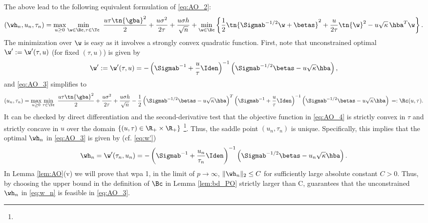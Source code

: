 The above lead to the following equivalent formulation of \eqref{eq:AO_2}:
\begin{align}
\left(\wh_n,u_n,\tau_n\right) = \max_{u\geq 0}\min_{\w\in\Bc,\tau\in\Tc} ~ \frac{u\tau\tn{\gba}^2}{2} + \frac{u\sigma^2}{2\tau} + \frac{u\sigma h}{\sqrt{n}} + \min_{\w\in\Bc} \left\{ \frac{1}{2}\tn{\Sigmab^{-1/2}\w+\betas}^2 + \frac{u}{2\tau}\tn{\w}^2 - u \sqrt{\kappa}\,{\hba}^T\w \right\} .\label{eq:AO_3}
\end{align}
The minimization over $\w$ is easy as it involves a strongly convex quadratic function. First, note that unconstrained optimal $\w':=\w'(\tau,u)$ (for fixed $(\tau,u)$) is given by
\begin{align}\label{eq:w'}
\w':=\w'(\tau,u) = -\left(\Sigmab^{-1}+\frac{u}{\tau}\Iden\right)^{-1}\left(\Sigmab^{-1/2}\betas-u\sqrt{\kappa}\hba\right), 
\end{align}
and \eqref{eq:AO_3} simplifies to
\begin{align}
\left(u_n,\tau_n\right)=\max_{u\geq 0}\min_{\tau\in\Tc} ~ \frac{u\tau\tn{\gba}^2}{2} + \frac{u\sigma^2}{2\tau} + \frac{u\sigma h}{\sqrt{n}} - \frac{1}{2} \left(\Sigmab^{-1/2}\betas-u\sqrt{\kappa}\hba\right)^T\left(\Sigmab^{-1}+\frac{u}{\tau}\Iden\right)^{-1} \left(\Sigmab^{-1/2}\betas-u\sqrt{\kappa}\hba\right)\,=:\Rc(u,\tau) .\label{eq:AO_4}
\end{align}
It can be checked by direct differentiation and the second-derivative test that the objective function in \eqref{eq:AO_4} is strictly convex in $\tau$ and strictly concave in $u$ over the domain $\{(u,\tau)\in\R_+\times\R_+\}$ \footnote{}. Thus, the saddle point $(u_n,\tau_n)$ is unique. Specifically, this implies that the optimal $\wh_n$ in \eqref{eq:AO_3} is given by (cf. \eqref{eq:w'})
\begin{align}\label{eq:w_n}
\wh_n=\w'(\tau_n,u_n) = -\left(\Sigmab^{-1}+\frac{u_n}{\tau_n}\Iden\right)^{-1}\left(\Sigmab^{-1/2}\betas-u_n\sqrt{\kappa}\hba\right).
\end{align}
In Lemma \ref{lem:AO}(v) we will prove that wpa 1, in the limit of $p\rightarrow\infty$, $\|\wh_n\|_2\leq C$ for sufficiently large absolute constant $C>0$. Thus, by choosing the upper bound in the definition of $\Bc$ in Lemma \ref{lem:bd_PO} strictly larger than C, guarantees that the unconstrained $\wh_n$ in \eqref{eq:w_n} is feasible in \eqref{eq:AO_3}.

